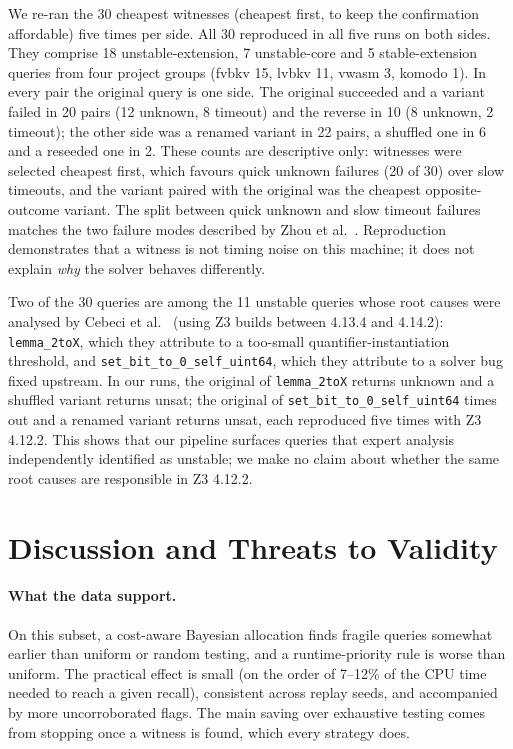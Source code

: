\documentclass[11pt]{article}
\newcommand{\unsat}{\textsf{unsat}}
\newcommand{\unknown}{\textsf{unknown}}
\newcommand{\timeout}{\textsf{timeout}}
\begin{document}
We re-ran the 30 cheapest witnesses (cheapest first, to keep the confirmation affordable) five times per side. All 30 reproduced in all five runs on both sides. They comprise 18 unstable-extension, 7 unstable-core and 5 stable-extension queries from four project groups (fvbkv 15, lvbkv 11, vwasm 3, komodo 1). In every pair the original query is one side. The original succeeded and a variant failed in 20 pairs (12 \unknown, 8 \timeout) and the reverse in 10 (8 \unknown, 2 \timeout); the other side was a renamed variant in 22 pairs, a shuffled one in 6 and a reseeded one in 2. These counts are descriptive only: witnesses were selected cheapest first, which favours quick \unknown{} failures (20 of 30) over slow timeouts, and the variant paired with the original was the cheapest opposite-outcome variant. The split between quick \unknown{} and slow \timeout{} failures matches the two failure modes described by Zhou et al.~\cite{cazamariposas}. Reproduction demonstrates that a witness is not timing noise on this machine; it does not explain \emph{why} the solver behaves differently.

Two of the 30 queries are among the 11 unstable queries whose root causes were analysed by Cebeci et al.~\cite{conjecture} (using Z3 builds between 4.13.4 and 4.14.2): \texttt{lemma\_2toX}, which they attribute to a too-small quantifier-instantiation threshold, and \texttt{set\_bit\_to\_0\_self\_uint64}, which they attribute to a solver bug fixed upstream. In our runs, the original of \texttt{lemma\_2toX} returns \unknown{} and a shuffled variant returns \unsat; the original of \texttt{set\_bit\_to\_0\_self\_uint64} times out and a renamed variant returns \unsat, each reproduced five times with Z3 4.12.2. This shows that our pipeline surfaces queries that expert analysis independently identified as unstable; we make no claim about whether the same root causes are responsible in Z3 4.12.2.

\section{Discussion and Threats to Validity}
\label{sec:discussion}

\paragraph{What the data support.} On this subset, a cost-aware Bayesian allocation finds fragile queries somewhat earlier than uniform or random testing, and a runtime-priority rule is worse than uniform. The practical effect is small (on the order of 7--12\% of the CPU time needed to reach a given recall), consistent across replay seeds, and accompanied by more uncorroborated flags. The main saving over exhaustive testing comes from stopping once a witness is found, which every strategy does.
\end{document}
